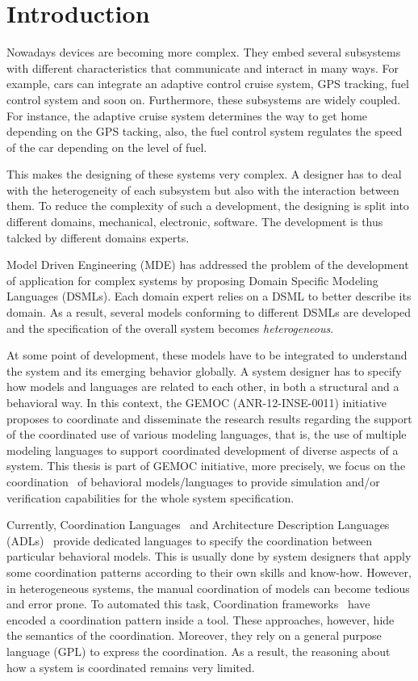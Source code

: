 \chapter{Introduction}	
Nowadays devices are becoming more complex. They embed several subsystems with different characteristics that communicate and interact in many ways. For example, cars can integrate an adaptive control cruise system, GPS tracking, fuel control system and soon on. Furthermore, these subsystems are widely coupled. For instance, the adaptive cruise system determines the way to get home depending on the GPS tacking, also, the fuel control system regulates the speed of the car depending on the level of fuel.
	
This makes the designing of these systems very complex. A designer has to deal with the heterogeneity of each subsystem but also with the interaction between them. To reduce the complexity of such a development, the designing is split into different domains, \eg mechanical, electronic, software. The development is thus talcked by different domains experts.
	
Model Driven Engineering (MDE) has addressed the problem of the development of application for complex systems by proposing Domain Specific Modeling Languages (DSMLs). Each domain expert relies on a DSML to better describe its domain. As a result, several models conforming to different DSMLs are developed and the specification of the overall system becomes \emph{heterogeneous}.

At some point of development, these models have to be integrated to understand the system and its emerging behavior globally. A system designer has to specify how models and languages are related to each other, in both a structural and a behavioral way. In this context, the GEMOC (ANR-12-INSE-0011) initiative proposes to coordinate and disseminate the research results regarding the support of the coordinated use of various modeling languages, that is, the use of multiple modeling languages to support coordinated development of diverse aspects of a system. This thesis is part of GEMOC initiative, more precisely, we focus on the coordination~\cite{coordsignibib} of behavioral models/languages to provide simulation and/or verification capabilities for the whole system specification. 
	
Currently, Coordination Languages~\cite{coordsignibib} and Architecture Description Languages (ADLs)~\cite{frameadlsbib} provide dedicated languages to specify the coordination between particular behavioral models. This is usually done by system designers that apply some coordination patterns according to their own skills and know-how. However, in heterogeneous systems, the manual coordination of models can become tedious and error prone. To automated this task, Coordination frameworks~\cite{ptoleframebib,modhelxbib} have encoded a coordination pattern inside a tool. These approaches, however, hide the semantics of the coordination. Moreover, they rely on a general purpose language (GPL) to express the coordination. As a result, the reasoning about how a system is coordinated remains very limited.  
	
